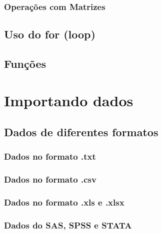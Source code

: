 \documentclass[
]{book}
\begin{document}
\hypertarget{operauxe7uxf5es-com-matrizes}{%
\subsection{Operações com Matrizes}\label{operauxe7uxf5es-com-matrizes}}

\hypertarget{uso-do-for-loop}{%
\section{Uso do for (loop)}\label{uso-do-for-loop}}

\hypertarget{funuxe7uxf5es}{%
\section{Funções}\label{funuxe7uxf5es}}

\hypertarget{import}{%
\chapter{Importando dados}\label{import}}

\hypertarget{dados-de-diferentes-formatos}{%
\section{Dados de diferentes formatos}\label{dados-de-diferentes-formatos}}

\hypertarget{dados-no-formato-.txt}{%
\subsection{Dados no formato .txt}\label{dados-no-formato-.txt}}

\hypertarget{dados-no-formato-.csv}{%
\subsection{Dados no formato .csv}\label{dados-no-formato-.csv}}

\hypertarget{dados-no-formato-.xls-e-.xlsx}{%
\subsection{Dados no formato .xls e .xlsx}\label{dados-no-formato-.xls-e-.xlsx}}

\hypertarget{dados-do-sas-spss-e-stata}{%
\subsection{Dados do SAS, SPSS e STATA}\label{dados-do-sas-spss-e-stata}}
\end{document}
